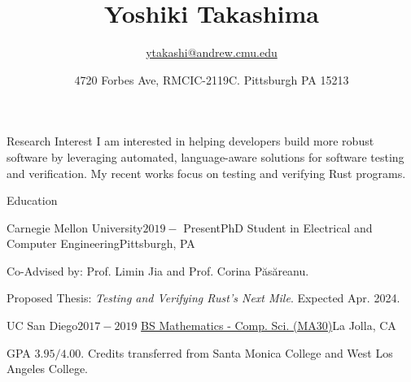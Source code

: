 \documentclass{resume} %
\title{\bf Yoshiki Takashima}
\author{\href{ytakashi@andrew.cmu.edu}{ytakashi@andrew.cmu.edu}}
\date{4720 Forbes Ave, RMCIC-2119C. Pittsburgh PA 15213}
\begin{document}
\maketitle

\begin{rSection}{Research Interest}
  I am interested in helping developers build more robust software by
  leveraging automated, language-aware solutions for software testing and
  verification. My recent works focus on testing and verifying Rust
  programs.
\end{rSection}

\begin{rSection}{Education}
  \begin{rSubsection}{Carnegie Mellon University}{$2019 -$
      Present}{PhD Student in Electrical and Computer
      Engineering}{Pittsburgh, PA}
  \item Co-Advised by: Prof. Limin Jia and Prof. Corina P\u{a}s\u{a}reanu.
  \item Proposed Thesis: \textit{Testing and Verifying Rust's Next Mile}. Expected Apr. 2024.
  \end{rSubsection}

  \begin{rSubsection}{UC San Diego}{$2017 -
      2019$}{
      \href{https://catalog.ucsd.edu/curric/MATH-ug.html}
      {BS Mathematics - Comp. Sci. (MA30)}}{La Jolla, CA}
  \item GPA $3.95/4.00$. Credits transferred from Santa Monica College
    and West Los Angeles College.
  \end{rSubsection}


\end{rSection}
\end{document}
